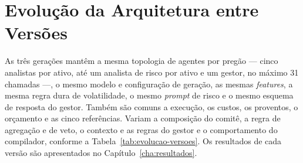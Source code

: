 \section{Evolução da Arquitetura entre Versões}
\label{sec:arq-evolucao}

As três gerações mantêm a mesma topologia de agentes por pregão --- cinco analistas por ativo, até um analista de risco por ativo e um gestor, no máximo 31 chamadas ---, o mesmo modelo e configuração de geração, as mesmas \textit{features}, a mesma regra dura de volatilidade, o mesmo \textit{prompt} de risco e o mesmo esquema de resposta do gestor. Também são comuns a execução, os custos, os proventos, o orçamento e as cinco referências. Variam a composição do comitê, a regra de agregação e de veto, o contexto e as regras do gestor e o comportamento do compilador, conforme a Tabela~\ref{tab:evolucao-versoes}. Os resultados de cada versão são apresentados no Capítulo~\ref{cha:resultados}.

